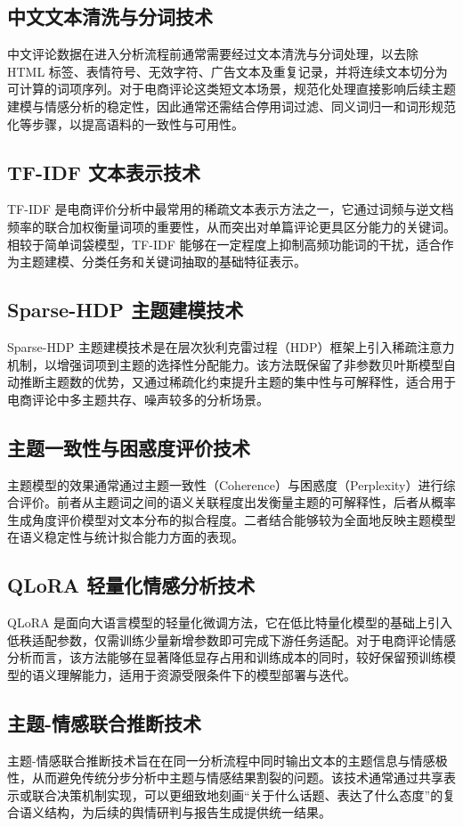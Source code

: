 \subsection{中文文本清洗与分词技术}
中文评论数据在进入分析流程前通常需要经过文本清洗与分词处理，以去除 HTML 标签、表情符号、无效字符、广告文本及重复记录，并将连续文本切分为可计算的词项序列。对于电商评论这类短文本场景，规范化处理直接影响后续主题建模与情感分析的稳定性，因此通常还需结合停用词过滤、同义词归一和词形规范化等步骤，以提高语料的一致性与可用性。

\subsection{TF-IDF 文本表示技术}
TF-IDF 是电商评价分析中最常用的稀疏文本表示方法之一，它通过词频与逆文档频率的联合加权衡量词项的重要性，从而突出对单篇评论更具区分能力的关键词。相较于简单词袋模型，TF-IDF 能够在一定程度上抑制高频功能词的干扰，适合作为主题建模、分类任务和关键词抽取的基础特征表示。

\subsection{Sparse-HDP 主题建模技术}
Sparse-HDP 主题建模技术是在层次狄利克雷过程（HDP）框架上引入稀疏注意力机制，以增强词项到主题的选择性分配能力。该方法既保留了非参数贝叶斯模型自动推断主题数的优势，又通过稀疏化约束提升主题的集中性与可解释性，适合用于电商评论中多主题共存、噪声较多的分析场景。

\subsection{主题一致性与困惑度评价技术}
主题模型的效果通常通过主题一致性（Coherence）与困惑度（Perplexity）进行综合评价。前者从主题词之间的语义关联程度出发衡量主题的可解释性，后者从概率生成角度评价模型对文本分布的拟合程度。二者结合能够较为全面地反映主题模型在语义稳定性与统计拟合能力方面的表现。

\subsection{QLoRA 轻量化情感分析技术}
QLoRA 是面向大语言模型的轻量化微调方法，它在低比特量化模型的基础上引入低秩适配参数，仅需训练少量新增参数即可完成下游任务适配。对于电商评论情感分析而言，该方法能够在显著降低显存占用和训练成本的同时，较好保留预训练模型的语义理解能力，适用于资源受限条件下的模型部署与迭代。

\subsection{主题-情感联合推断技术}
主题-情感联合推断技术旨在在同一分析流程中同时输出文本的主题信息与情感极性，从而避免传统分步分析中主题与情感结果割裂的问题。该技术通常通过共享表示或联合决策机制实现，可以更细致地刻画“关于什么话题、表达了什么态度”的复合语义结构，为后续的舆情研判与报告生成提供统一结果。

